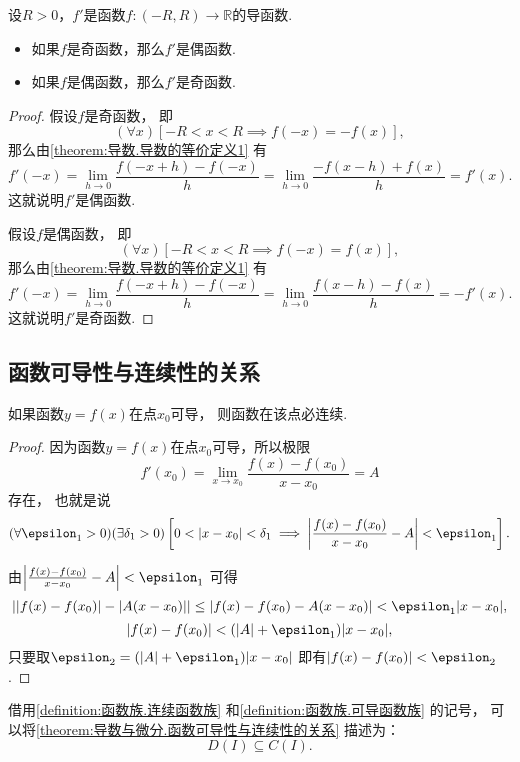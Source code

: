 \begin{proposition}\label{theorem:导数与微分.导函数的奇偶性}
设\(R>0\)，\(f'\)是函数\(f\colon(-R,R)\to\mathbb{R}\)的导函数.
\begin{itemize}
	\item 如果\(f\)是奇函数，那么\(f'\)是偶函数.
	\item 如果\(f\)是偶函数，那么\(f'\)是奇函数.
\end{itemize}
\begin{proof}
假设\(f\)是奇函数，
即\[
	(\forall x)
	[
		-R < x < R
		\implies
		f(-x) = -f(x)
	],
\]
那么由\cref{theorem:导数.导数的等价定义1} 有\[
	f'(-x)
	= \lim_{h\to0} \frac{f(-x+h)-f(-x)}{h}
	= \lim_{h\to0} \frac{-f(x-h)+f(x)}{h}
	= f'(x).
\]
这就说明\(f'\)是偶函数.

假设\(f\)是偶函数，
即\[
	(\forall x)
	[
		-R < x < R
		\implies
		f(-x) = f(x)
	],
\]
那么由\cref{theorem:导数.导数的等价定义1} 有\[
	f'(-x)
	= \lim_{h\to0} \frac{f(-x+h)-f(-x)}{h}
	= \lim_{h\to0} \frac{f(x-h)-f(x)}{h}
	= -f'(x).
\]
这就说明\(f'\)是奇函数.
\end{proof}
\end{proposition}

\subsection{函数可导性与连续性的关系}
\begin{theorem}\label{theorem:导数与微分.函数可导性与连续性的关系}
如果函数\(y = f(x)\)在点\(x_0\)可导，
则函数在该点必连续.
\begin{proof}
因为函数\(y = f(x)\)在点\(x_0\)可导，所以极限\[
	f'(x_0) = \lim_{x \to x_0}\frac{f(x)-f(x_0)}{x-x_0} = A
\]存在，
也就是说\[
	(\forall \epsilon_1 > 0)
	(\exists \delta_1 > 0)
	\left[
		0 < \abs{x-x_0} < \delta_1
		\implies
		\abs{\frac{f(x)-f(x_0)}{x-x_0} - A} < \epsilon_1
	\right].
\]

由\(\abs{\frac{f(x)-f(x_0)}{x-x_0} - A} < \epsilon_1\)
可得\[
	\abs{\abs{f(x)-f(x_0)} - \abs{A(x-x_0)}}
	\leq \abs{f(x)-f(x_0) - A(x-x_0)}
	< \epsilon_1 \abs{x-x_0},
\]\[
	\abs{f(x)-f(x_0)} < (\abs{A} + \epsilon_1) \abs{x-x_0},
\]
只要取\(\epsilon_2 = (\abs{A} + \epsilon_1) \abs{x-x_0}\)
即有\(\abs{f(x)-f(x_0)} < \epsilon_2\).
\end{proof}
\end{theorem}
借用\cref{definition:函数族.连续函数族} 和\cref{definition:函数族.可导函数族} 的记号，
可以将\cref{theorem:导数与微分.函数可导性与连续性的关系} 描述为：\[
	D(I) \subseteq C(I).
\]

